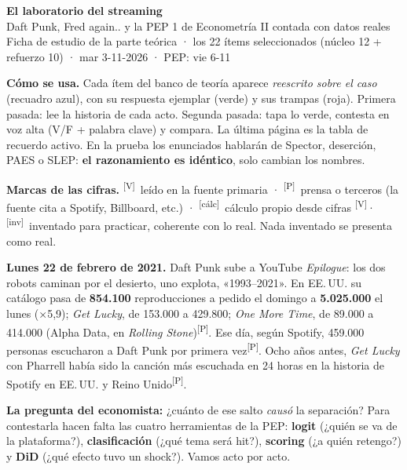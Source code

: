 \documentclass[10pt,a4paper]{article}
\newcommand{\V}{\textsuperscript{\textcolor{green!45!black}{[V]}}}
\newcommand{\Pre}{\textsuperscript{\textcolor{orange!80!black}{[P]}}}
\newcommand{\inv}{\textsuperscript{\textcolor{red!60!black}{[inv]}}}
\newcommand{\calc}{\textsuperscript{\textcolor{blue!60!black}{[cálc]}}}
\begin{document}
\renewcommand{\%}{\ifmmode\mbox{\char37}\else\char37\fi}

\begin{center}
{\LARGE\bfseries El laboratorio del streaming}\\[3pt]
{\large Daft Punk, Fred again.. y la PEP 1 de Econometría II contada con datos reales}\\[3pt]
\small Ficha de estudio de la parte teórica · los 22 ítems seleccionados (núcleo 12 + refuerzo 10) · mar 3-11-2026 · PEP: vie 6-11
\end{center}

\textbf{Cómo se usa.} Cada ítem del banco de teoría aparece \emph{reescrito sobre el caso} (recuadro azul), con su respuesta ejemplar (verde) y sus trampas (roja). Primera pasada: lee la historia de cada acto. Segunda pasada: tapa lo verde, contesta en voz alta (V/F + palabra clave) y compara. La última página es la tabla de recuerdo activo. En la prueba los enunciados hablarán de Spector, deserción, PAES o SLEP: \textbf{el razonamiento es idéntico}, solo cambian los nombres.

\textbf{Marcas de las cifras.} \V\ leído en la fuente primaria · \Pre\ prensa o terceros (la fuente cita a Spotify, Billboard, etc.) · \calc\ cálculo propio desde cifras \V · \inv\ inventado para practicar, coherente con lo real. Nada inventado se presenta como real.

\begin{gancho}
\textbf{Lunes 22 de febrero de 2021.} Daft Punk sube a YouTube \emph{Epilogue}: los dos robots caminan por el desierto, uno explota, «1993–2021». En EE.\,UU. su catálogo pasa de \textbf{854.100} reproducciones a pedido el domingo a \textbf{5.025.000} el lunes (×5,9); \emph{Get Lucky}, de 153.000 a 429.800; \emph{One More Time}, de 89.000 a 414.000 (Alpha Data, en \emph{Rolling Stone})\Pre. Ese día, según Spotify, 459.000 personas escucharon a Daft Punk por primera vez\Pre. Ocho años antes, \emph{Get Lucky} con Pharrell había sido la canción más escuchada en 24 horas en la historia de Spotify en EE.\,UU. y Reino Unido\Pre.

\textbf{La pregunta del economista:} ¿cuánto de ese salto \emph{causó} la separación? Para contestarla hacen falta las cuatro herramientas de la PEP: \textbf{logit} (¿quién se va de la plataforma?), \textbf{clasificación} (¿qué tema será hit?), \textbf{scoring} (¿a quién retengo?) y \textbf{DiD} (¿qué efecto tuvo un shock?). Vamos acto por acto.
\end{gancho}
\end{document}

